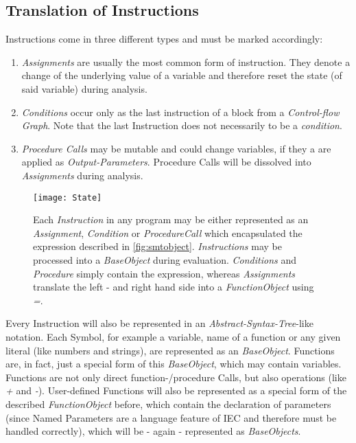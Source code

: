 \subsection{Translation of Instructions}
Instructions come in three different types and must be marked accordingly:
\begin{enumerate}
	\item \emph{Assignments} are usually the most common form of instruction. They denote a change of the underlying value of a variable and therefore reset the state (of said variable) during analysis. 
	\item \emph{Conditions} occur only as the last instruction of a block from a \emph{Control-flow Graph}. Note that the last Instruction does not necessarily to be a \emph{condition}.
	\item \emph{Procedure Calls} may be mutable and could change variables, if they a are applied as \emph{Output-Parameters}. Procedure Calls will be dissolved into \emph{Assignments} during analysis.
\end{enumerate}
\begin{figure}[h!]
	\centering
	\texttt{[image: State]}
	\caption{Each \emph{Instruction} in any program may be either represented as an \emph{Assignment}, \emph{Condition} or \emph{ProcedureCall} which encapsulated the expression described in \ref{fig:smtobject}. \emph{Instructions} may be processed into a \emph{BaseObject} during evaluation. \emph{Conditions} and \emph{Procedure} simply contain the expression, whereas \emph{Assignments} translate the left - and right hand side into a \emph{FunctionObject} using \emph{=}.}
	\label{fig:state}
\end{figure}

Every Instruction will also be represented in an \emph{Abstract-Syntax-Tree}-like notation. Each Symbol, for example a variable, name of a function or any given literal (like numbers and strings), are represented as an \emph{BaseObject}. Functions are, in fact, just a special form of this \emph{BaseObject}, which may contain variables. Functions are not only direct function-/procedure Calls, but also operations (like \emph{+} and \emph{-}). User-defined Functions will also be represented as a special form of the described \emph{FunctionObject} before, which contain the declaration of parameters (since Named Parameters are a language feature of IEC and therefore must be handled correctly), which will be - again - represented as \emph{BaseObjects}. 


